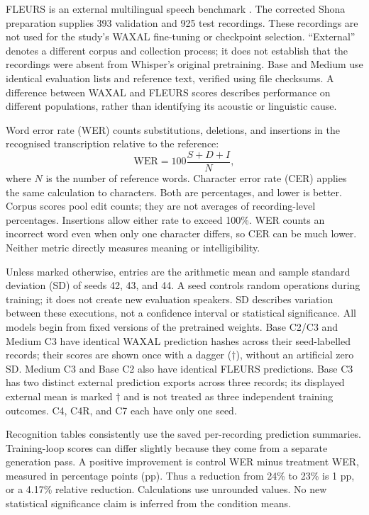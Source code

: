 \documentclass[12pt,a4paper]{report}
\begin{document}
FLEURS is an external multilingual speech benchmark \citep{Conneau2022}.
The corrected Shona preparation supplies 393 validation and 925 test recordings.
These recordings are not used for the study's WAXAL fine-tuning or checkpoint
selection. ``External'' denotes a different corpus and collection process;
it does not establish that the recordings were absent from Whisper's original
pretraining. Base and Medium use identical evaluation lists and reference text,
verified using file checksums. A difference between WAXAL and FLEURS scores describes
performance on different populations, rather than identifying its acoustic
or linguistic cause.

Word error rate (WER) counts substitutions, deletions, and insertions in the
recognised transcription relative to the reference:
\begin{equation}
\mathrm{WER}=100\frac{S+D+I}{N},
\end{equation}
where $N$ is the number of reference words. Character error rate (CER) applies
the same calculation to characters. Both are percentages, and lower is better.
Corpus scores pool edit counts; they are not averages of recording-level
percentages. Insertions allow either rate to exceed 100\%. WER counts an
incorrect word even when only one character differs, so CER can be much lower.
Neither metric directly measures meaning or intelligibility.

Unless marked otherwise, entries are the arithmetic mean and sample standard
deviation (SD) of seeds 42, 43, and 44. A seed controls random operations during
training; it does not create new evaluation speakers. SD describes variation
between these executions, not a confidence interval or statistical significance.
All models begin from fixed versions of the pretrained weights. Base C2/C3 and Medium C3
have identical WAXAL prediction hashes across their seed-labelled records;
their scores are shown once with a dagger ($\dagger$), without an artificial
zero SD. Medium C3 and Base C2 also have identical FLEURS predictions. Base
C3 has two distinct external prediction exports across three records; its
displayed external mean is marked $\dagger$ and is not treated as three
independent training outcomes. C4, C4R, and C7 each have only one seed.

Recognition tables consistently use the saved per-recording prediction summaries.
Training-loop scores can differ slightly because they come from a separate
generation pass. A positive improvement is control WER minus treatment WER,
measured in percentage points (pp). Thus a reduction from 24\% to 23\% is
1 pp, or a 4.17\% relative reduction. Calculations use unrounded values.
No new statistical significance claim is inferred from the condition means.
\end{document}
